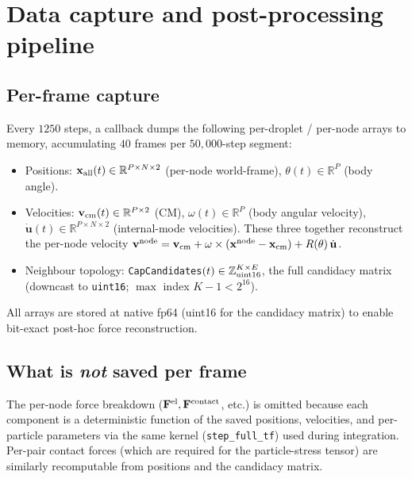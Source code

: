 \documentclass[aps,pre,twocolumn,floatfix,longbibliography]{revtex4-2}
\begin{document}
\section{Data capture and post-processing pipeline}
\label{sec:capture}

\subsection{Per-frame capture}
Every $1250$ steps, a callback dumps the following per-droplet /
per-node arrays to memory, accumulating $40$ frames per $50{,}000$-step
segment:
\begin{itemize}
\item Positions: $\mathbf x_{\rm all}(t) \in \mathbb R^{P \times N \times 2}$
      (per-node world-frame), $\theta(t) \in \mathbb R^P$ (body angle).
\item Velocities: $\mathbf v_{\rm cm}(t) \in \mathbb R^{P \times 2}$
      (CM), $\omega(t) \in \mathbb R^P$ (body angular velocity),
      $\dot{\mathbf u}(t) \in \mathbb R^{P \times N \times 2}$
      (internal-mode velocities).  These three together reconstruct
      the per-node velocity $\mathbf v^{\rm node} = \mathbf v_{\rm cm}
      + \omega \times (\mathbf x^{\rm node} - \mathbf x_{\rm cm}) +
      R(\theta)\, \dot{\mathbf u}$.
\item Neighbour topology: \texttt{CapCandidates}$(t) \in
      \mathbb Z_{\rm uint16}^{K \times E}$, the full candidacy matrix
      (downcast to \texttt{uint16}; $\max$ index $K - 1 < 2^{16}$).
\end{itemize}
All arrays are stored at native fp64 (uint16 for the candidacy matrix)
to enable bit-exact post-hoc force reconstruction.

\subsection{What is \emph{not} saved per frame}
The per-node force breakdown ($\mathbf F^{\rm el}, \mathbf F^{\rm
contact}$, etc.) is omitted because each component is a deterministic
function of the saved positions, velocities, and per-particle
parameters via the same kernel (\texttt{step\_full\_tf}) used during
integration.  Per-pair contact forces (which are required for the
particle-stress tensor) are similarly recomputable from positions and
the candidacy matrix.
\end{document}
